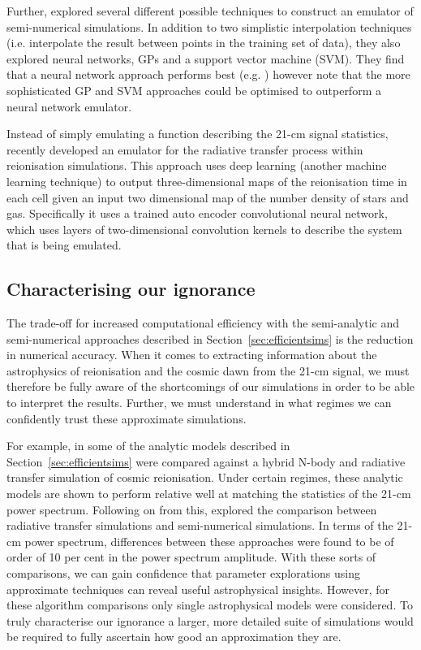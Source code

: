 Further, \cite{Jennings:2019} explored several different possible techniques to construct an emulator of semi-numerical simulations. In addition to two simplistic interpolation techniques (i.e. interpolate the result between points in the training set of data), they also explored neural networks, GPs and a support vector machine (SVM). They find that a neural network approach performs best (e.g. \cite{Schmit:2018}) however note that the more sophisticated GP and SVM approaches could be optimised to outperform a neural network emulator.

Instead of simply emulating a function describing the 21-cm signal statistics, recently \cite{Chardin:2019} developed an emulator for the radiative transfer process within reionisation simulations. This approach uses deep learning (another machine learning technique) to output three-dimensional maps of the reionisation time in each cell given an input two dimensional map of the number density of stars and gas. Specifically it uses a trained auto encoder convolutional neural network, which uses layers of two-dimensional convolution kernels to describe the system that is being emulated.

\subsection{Characterising our ignorance}

The trade-off for increased computational efficiency with the semi-analytic and semi-numerical approaches described in Section~\ref{sec:efficientsims} is the reduction in numerical accuracy. When it comes to extracting information about the astrophysics of reionisation and the cosmic dawn from the 21-cm signal, we must therefore be fully aware of the shortcomings of our simulations in order to be able to interpret the results. Further, we must understand in what regimes we can confidently trust these approximate simulations.

For example, in \cite{Santos:2008} some of the analytic models described in Section~\ref{sec:efficientsims} were compared against a hybrid N-body and radiative transfer simulation of cosmic reionisation. Under certain regimes, these analytic models are shown to perform relative well at matching the statistics of the 21-cm power spectrum. Following on from this, \cite{Zahn:2011} explored the comparison between radiative transfer simulations and semi-numerical simulations. In terms of the 21-cm power spectrum, differences between these approaches were found to be of order of 10 per cent in the power spectrum amplitude. With these sorts of comparisons, we can gain confidence that parameter explorations using approximate techniques can reveal useful astrophysical insights. However, for these algorithm comparisons only single astrophysical models were considered. To truly characterise our ignorance a larger, more detailed suite of simulations would be required to fully ascertain how good an approximation they are.

